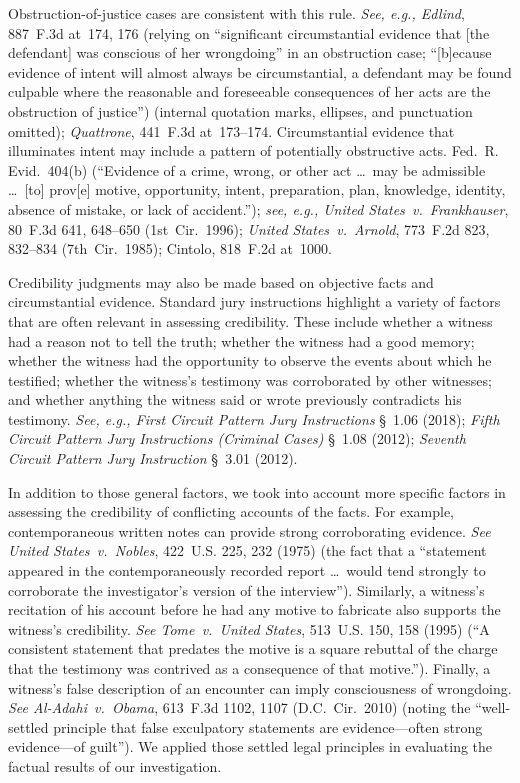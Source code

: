 Obstruction-of-justice cases are consistent with this rule.
\textit{See, e.g., Edlind}, 887~F.3d at~174, 176 (relying on ``significant circumstantial evidence that [the defendant] was conscious of her wrongdoing'' in an obstruction case; ``[b]ecause evidence of intent will almost always be circumstantial, a defendant may be found culpable where the reasonable and foreseeable consequences of her acts are the obstruction of justice'') (internal quotation marks, ellipses, and punctuation omitted);
\textit{Quattrone}, 441~F.3d at~173--174.
Circumstantial evidence that illuminates intent may include a pattern of potentially obstructive acts. Fed.~R. Evid.~404(b) (``Evidence of a crime, wrong, or other act \dots\ may be admissible \dots\ [to] prov[e] motive, opportunity, intent, preparation, plan, knowledge, identity, absence of mistake, or lack of accident.'');
\textit{see, e.g., United States~v.\ Frankhauser}, 80~F.3d 641, 648--650 (1st~Cir.~1996);
\textit{United States~v.\ Arnold}, 773~F.2d 823, 832--834 (7th~Cir.~1985);
Cintolo, 818~F.2d at~1000.

Credibility judgments may also be made based on objective facts and circumstantial evidence.
Standard jury instructions highlight a variety of factors that are often relevant in assessing credibility.
These include whether a witness had a reason not to tell the truth; whether the witness had a good memory;
whether the witness had the opportunity to observe the events about which he testified;
whether the witness's testimony was corroborated by other witnesses;
and whether anything the witness said or wrote previously contradicts his testimony.
\textit{See, e.g., First Circuit Pattern Jury Instructions} \S~1.06 (2018);
\textit{Fifth Circuit Pattern Jury Instructions (Criminal Cases)} \S~1.08 (2012);
\textit{Seventh Circuit Pattern Jury Instruction} \S~3.01 (2012).

In addition to those general factors, we took into account more specific factors in assessing the credibility of conflicting accounts of the facts.
For example, contemporaneous written notes can provide strong corroborating evidence.
\textit{See United States~v.\ Nobles}, 422~U.S. 225, 232 (1975) (the fact that a ``statement appeared in the contemporaneously recorded report \dots\ would tend strongly to corroborate the investigator's version of the interview'').
Similarly, a witness's recitation of his account before he had any motive to fabricate also supports the witness's credibility.
\textit{See Tome~v.\ United States}, 513~U.S. 150, 158 (1995) (``A consistent statement that predates the motive is a square rebuttal of the charge that the testimony was contrived as a consequence of that motive.'').
Finally, a witness's false description of an encounter can imply consciousness of wrongdoing.
\textit{See Al-Adahi~v.\ Obama}, 613~F.3d 1102, 1107 (D.C.~Cir.~2010) (noting the ``well-settled principle that false exculpatory statements are evidence---often strong evidence---of guilt'').
We applied those settled legal principles in evaluating the factual results of our investigation.
